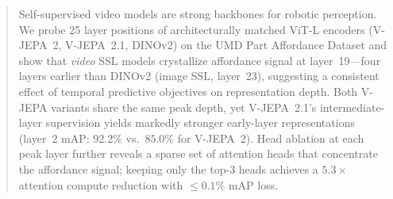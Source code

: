 \begin{abstract}
Self-supervised video models are strong backbones for robotic perception.
We probe 25 layer positions of architecturally matched ViT-L encoders
(V-JEPA~2, V-JEPA~2.1, DINOv2) on the UMD Part Affordance Dataset and show that
\emph{video} SSL models crystallize affordance signal at layer~19---four layers earlier
than DINOv2 (image SSL, layer~23), suggesting a consistent effect of temporal predictive
objectives on representation depth.
Both V-JEPA variants share the same peak depth, yet V-JEPA~2.1's intermediate-layer
supervision yields markedly stronger early-layer representations
(layer~2 mAP: $92.2\%$ vs.\ $85.0\%$ for V-JEPA~2).
Head ablation at each peak layer further reveals a sparse set of attention heads that
concentrate the affordance signal; keeping only the top-3 heads achieves a
$5.3{\times}$ attention compute reduction with ${\leq}0.1\%$ mAP loss.
\end{abstract}
